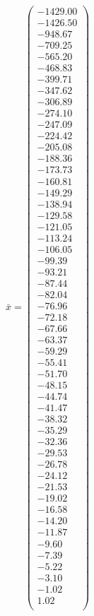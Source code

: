 \documentclass[a4paper,12pt]{article}
\begin{document}
$\bar { x } = \begin{pmatrix}
-1429.00 \\
-1426.50 \\
-948.67 \\
-709.25 \\
-565.20 \\
-468.83 \\
-399.71 \\
-347.62 \\
-306.89 \\
-274.10 \\
-247.09 \\
-224.42 \\
-205.08 \\
-188.36 \\
-173.73 \\
-160.81 \\
-149.29 \\
-138.94 \\
-129.58 \\
-121.05 \\
-113.24 \\
-106.05 \\
-99.39 \\
-93.21 \\
-87.44 \\
-82.04 \\
-76.96 \\
-72.18 \\
-67.66 \\
-63.37 \\
-59.29 \\
-55.41 \\
-51.70 \\
-48.15 \\
-44.74 \\
-41.47 \\
-38.32 \\
-35.29 \\
-32.36 \\
-29.53 \\
-26.78 \\
-24.12 \\
-21.53 \\
-19.02 \\
-16.58 \\
-14.20 \\
-11.87 \\
-9.60 \\
-7.39 \\
-5.22 \\
-3.10 \\
-1.02 \\
1.02 \\
\end{pmatrix}
$
\end{document}
